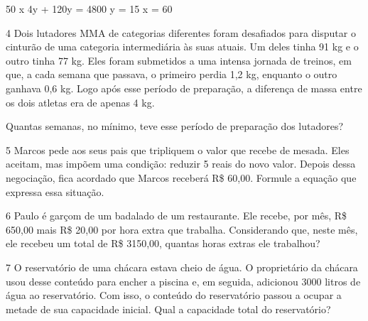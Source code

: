\begin{escolha}
\begin{boxmedio}
{50 x 4y + 120y = 4800 \rightarrow y = 15 \therefore x = 60}
\end{boxmedio}


\num{4} Dois lutadores MMA de categorias diferentes foram desafiados para
disputar o cinturão de uma categoria intermediária às suas atuais. Um
deles tinha 91 kg e o outro tinha 77 kg. Eles foram submetidos a uma
intensa jornada de treinos, em que, a cada semana que passava, o primeiro
perdia 1,2 kg, enquanto o outro ganhava 0,6 kg. Logo após esse período de
preparação, a diferença de massa entre os dois atletas era de apenas 4 kg.

Quantas semanas, no mínimo, teve esse período de preparação dos
lutadores?

\begin{boxmedio}
\end{boxmedio}

\num{5} Marcos pede aos seus pais que tripliquem o valor que recebe de mesada.
Eles aceitam, mas impõem uma condição: reduzir 5 reais do novo valor. Depois 
dessa negociação, fica acordado que Marcos receberá R\$ 60,00. 
Formule a equação que expressa essa situação.

\begin{boxpeq}
\end{boxpeq}

\num{6} Paulo é garçom de um badalado de um restaurante. Ele recebe, por mês,
R\$ 650,00 mais R\$ 20,00 por hora extra que trabalha. Considerando que,
neste mês, ele recebeu um total de R\$ 3150,00, quantas horas extras ele 
trabalhou?

\begin{boxpeq}
\end{boxpeq}

\num{7} O reservatório de uma chácara estava cheio de água. O proprietário 
da chácara usou  desse conteúdo para encher a piscina e, em seguida,
adicionou 3000 litros de água ao reservatório. Com isso, o conteúdo do
reservatório passou a ocupar a metade de sua capacidade inicial. Qual a
capacidade total do reservatório?


\end{escolha}

